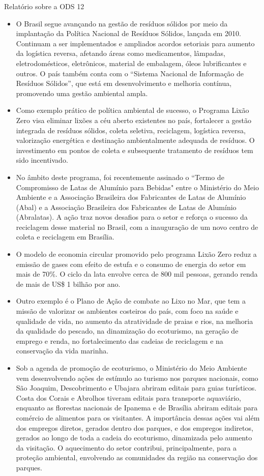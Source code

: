 \documentclass{beamer}
\begin{document}
\begin{frame}[allowframebreaks]{Relatório sobre a ODS 12}
		\begin{itemize}
			\item O Brasil segue avançando na gestão de resíduos sólidos por meio da implantação da Política Nacional de Resíduos Sólidos, lançada em 2010. Continuam a ser implementados e ampliados acordos setoriais para aumento da logística reversa, afetando áreas como medicamentos, lâmpadas, eletrodomésticos, eletrônicos, material de embalagem, óleos lubrificantes e outros. O país também conta com o “Sistema Nacional de Informação de Resíduos Sólidos”, que está em desenvolvimento e melhoria contínua, promovendo uma gestão ambiental ampla.
			\item Como exemplo prático de política ambiental de sucesso, o Programa Lixão Zero visa eliminar lixões a céu aberto existentes no país, fortalecer a gestão integrada de resíduos sólidos, coleta seletiva, reciclagem, logística reversa, valorização energética e destinação ambientalmente adequada de resíduos. O investimento em pontos de coleta e subsequente tratamento de resíduos tem sido incentivado.
			\item No âmbito deste programa, foi recentemente assinado o ``Termo de Compromisso de Latas de Alumínio para Bebidas" entre o Ministério do Meio Ambiente e a Associação Brasileira dos Fabricantes de Latas de Alumínio (Abal) e a Associação Brasileira dos Fabricantes de Latas de Alumínio (Abralatas). A ação traz novos desafios para o setor e reforça o sucesso da reciclagem desse material no Brasil, com a inauguração de um novo centro de coleta e reciclagem em Brasília.
			\item O modelo de economia circular promovido pelo programa Lixão Zero reduz a emissão de gases com efeito de estufa e o consumo de energia do setor em mais de 70\%. O ciclo da lata envolve cerca de 800 mil pessoas, gerando renda de mais de US\$ 1 bilhão por ano.
			\item Outro exemplo é o Plano de Ação de combate ao Lixo no Mar, que tem a missão de valorizar os ambientes costeiros do país, com foco na saúde e qualidade de vida, no aumento da atratividade de praias e rios, na melhoria da qualidade do pescado, na dinamização do ecoturismo, na geração de emprego e renda, no fortalecimento das cadeias de reciclagem e na conservação da vida marinha.
			\item Sob a agenda de promoção de ecoturismo, o Ministério do Meio Ambiente vem desenvolvendo ações de estímulo ao turismo nos parques nacionais, como São Joaquim, Descobrimento e Ubajara abriram editais para guias turísticos. Costa dos Corais e Abrolhos tiveram editais para transporte aquaviário, enquanto as florestas nacionais de Ipanema e de Brasília abriram editais para comércio de alimentos para os visitantes. A importância dessas ações vai além dos empregos diretos, gerados dentro dos parques, e dos empregos indiretos, gerados ao longo de toda a cadeia do ecoturismo, dinamizada pelo aumento da visitação. O aquecimento do setor contribui, principalmente, para a proteção ambiental, envolvendo as comunidades da região na conservação dos parques.

\end{itemize}
\end{frame}
\end{document}
